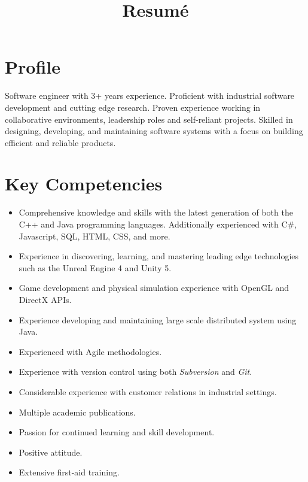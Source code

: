 \documentclass[11pt,a4paper,sans]{moderncv}        %
\title{Resumé}                               %
\begin{document}
\makecvtitle
\section{Profile}
Software engineer with 3+ years experience. 
Proficient with industrial software development and cutting edge research.
Proven experience working in collaborative environments, leadership roles and self-reliant projects.
Skilled in designing, developing, and maintaining software systems with a focus on building efficient and reliable products.
\section{Key Competencies}
\begin{itemize}
	\item Comprehensive knowledge and skills with the latest generation of both the C++ and Java programming languages. Additionally experienced with C\#, Javascript, SQL, HTML, CSS, and more.
	\item Experience in discovering, learning, and mastering leading edge technologies such as the Unreal Engine 4 and Unity 5.
	\item Game development and physical simulation experience with OpenGL and DirectX APIs.
	\item Experience developing and maintaining large scale distributed system using Java.
	\item Experienced with Agile methodologies.
	\item Experience with version control using both \textit{Subversion} and \textit{Git}.
	\item Considerable experience with customer relations in industrial settings.
	\item Multiple academic publications.
	\item Passion for continued learning and skill development.
	\item Positive attitude.
	\item Extensive first-aid training.
\end{itemize}
\end{document}
